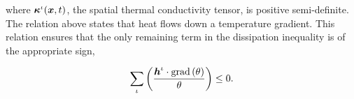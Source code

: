\noindent where $\mbox{\boldmath$\kappa$}^{\iota}(\mbox{\boldmath$ x$},t)$, the spatial thermal
conductivity tensor, is positive semi-definite. The relation above
states that heat flows down a temperature gradient. This relation
ensures that the only remaining term in the dissipation inequality is
of the appropriate sign,

\begin{equation*}
\sum\limits_{\iota} \left(\frac{\mbox{\boldmath$ h$}^{\iota} \cdot
  \mathrm{grad}\left(\theta\right)}{\theta} \right) \leq 0.
\end{equation*}

%

